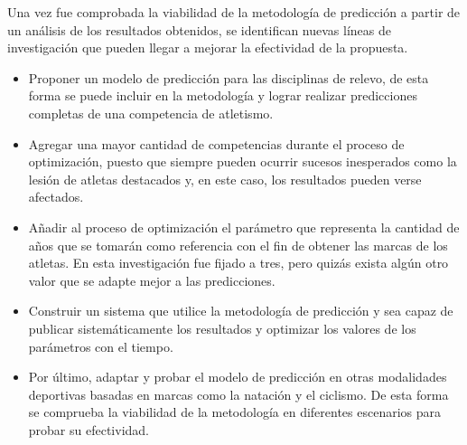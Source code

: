 \begin{recomendations}

Una vez fue comprobada la viabilidad de la metodología de predicción a partir de un análisis de los resultados obtenidos, se identifican nuevas líneas de investigación que pueden llegar a mejorar la efectividad de la propuesta.

\begin{itemize}
    \item Proponer un modelo de predicción para las disciplinas de relevo, de esta forma se puede incluir en la metodología y lograr realizar predicciones completas de una competencia de atletismo.
    \item Agregar una mayor cantidad de competencias durante el proceso de optimización, puesto que siempre pueden ocurrir sucesos inesperados como la lesión de atletas destacados y, en este caso, los resultados pueden verse afectados.
    \item Añadir al proceso de optimización el parámetro que representa la cantidad de años que se tomarán como referencia con el fin de obtener las marcas de los atletas. En esta investigación fue fijado a tres, pero quizás exista algún otro valor que se adapte mejor a las predicciones.
    \item Construir un sistema que utilice la metodología de predicción y sea capaz de publicar sistemáticamente los resultados y optimizar los valores de los parámetros con el tiempo.
    \item Por último, adaptar y probar el modelo de predicción en otras modalidades deportivas basadas en marcas como la natación y el ciclismo. De esta forma se comprueba la viabilidad de la metodología en diferentes escenarios para probar su efectividad.
\end{itemize}
    
\end{recomendations}
